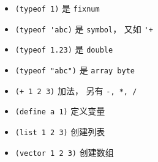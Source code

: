 
\begin{itemize}
\item \verb`(typeof 1)` 是 \verb`fixnum`
\item \verb`(typeof 'abc)` 是 \verb`symbol`， 又如 \verb`'+`
\item \verb`(typeof 1.23)` 是 \verb`double`
\item \verb`(typeof "abc")` 是 \verb`array byte`
\item \verb`(+ 1 2 3)` 加法， 另有 \verb`-, *, /`
\item \verb`(define a 1)` 定义变量
\item \verb`(list 1 2 3)` 创建列表
\item \verb`(vector 1 2 3)` 创建数组
\end{itemize}

